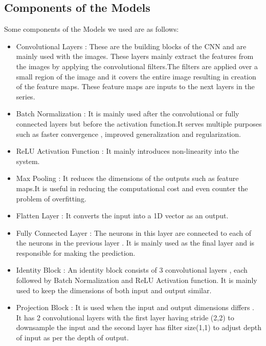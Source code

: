 \documentclass[conference]{IEEEtran}
\begin{document}
\subsection{Components of the Models}\label{SCM}
Some components of the Models we used are as follows:
\begin{itemize}
\item Convolutional Layers : These are the building blocks of the CNN and are mainly used with the images. These layers mainly extract the features from the images by applying the convolutional filters.The filters are applied over a small region of the image and it covers the entire image resulting in creation of the feature maps. These feature maps are inputs to the next layers in the series.

\item Batch Normalization : It is mainly used after the convolutional or fully connected layers but before the activation function.It serves multiple purposes such as faster convergence , improved generalization and regularization.

\item ReLU Activation Function : It mainly introduces non-linearity into the system.

\item Max Pooling : It reduces the dimensions of the outputs such as feature maps.It is useful in reducing the computational cost and even counter the problem of overfitting.

\item Flatten Layer : It converts the input into a 1D vector as an output.

\item Fully Connected Layer : The neurons in this layer are connected to each of the neurons in the previous layer . It is mainly used as the final layer and  is responsible for making the prediction.

\item Identity Block : An  identity block consists of 3 convolutional layers , each followed by Batch Normalization and ReLU Activation function. It is mainly used to keep the dimensions of both input and output similar.

\item Projection Block : It is used when the input and output dimensions differs . It has 2 convolutional layers with the first layer having stride (2,2) to downsample the input and the second layer has filter size(1,1) to adjust depth of input as per the depth of output. 
\end{itemize}
\end{document}
